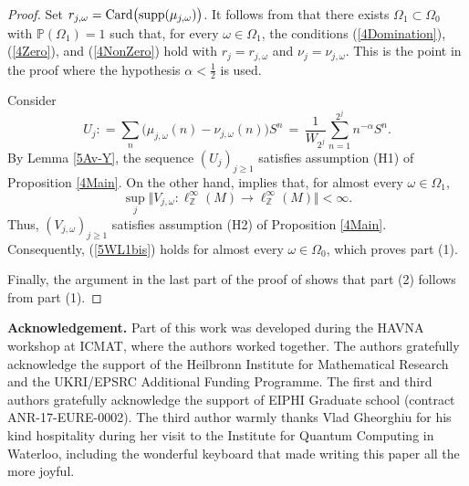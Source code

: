 \documentclass[12pt]{amsart}
\newcommand{\Pdb}{\mbox{$\mathbb{P}$}}
\newcommand{\bignorm}[1]{\bigl\Vert#1\bigr\Vert}
\theoremstyle{remark}
\theoremstyle{definition}
\numberwithin{equation}{section}
\begin{document}
\begin{proof}
Set $r_{j,\omega} = {\rm Card}\bigl({\rm supp}(\mu_{j,\omega})\bigr)$.
It follows from \cite[Section 4]{LaV} that there exists
$\Omega_1\subset\Omega_0$ with $\Pdb(\Omega_1)=1$ such that,
for every $\omega\in\Omega_1$, the conditions
(\ref{4Domination}), (\ref{4Zero}), and (\ref{4NonZero}) hold with
$r_j=r_{j,\omega}$ and $\nu_j=\nu_{j,\omega}$. This is the point in the proof where the hypothesis $\alpha<\frac12$ is used.

Consider 
$$
U_{j} : = \sum_n\bigl(\mu_{j,\omega}(n)-\nu_{j,\omega}(n)\bigr) S^n\,
=\,\frac{1}{W_{2^j}}\sum_{n=1}^{2^j} n^{-\alpha} S^n.
$$
By Lemma \ref{5Av-Y}, the sequence $(U_j)_{j\geq1}$ satisfies
assumption (H1) of Proposition \ref{4Main}. On the other hand,
\cite[Lemma 5.5]{LZ} implies that, for almost every
$\omega\in\Omega_1$,
$$
\sup_j
\bignorm{V_{j,\omega}\colon
\ell^\infty_{\mathbb Z}(M)\longrightarrow\ell^\infty_{\mathbb Z}(M)}
<\infty.
$$
Thus, $(V_{j,\omega})_{j\geq1}$ satisfies assumption (H2) of
Proposition \ref{4Main}. Consequently, (\ref{5WL1bis}) holds for
almost every $\omega\in\Omega_0$, which proves part (1).

Finally, the argument in the last part of the proof of \cite[Theorem 5.2]{LZ} shows that part (2) follows from part (1).
\end{proof}


\bigskip\noindent
{\bf Acknowledgement.} Part of this work was developed during the HAVNA workshop at ICMAT, where the authors worked together. The authors gratefully acknowledge the support of the Heilbronn Institute for Mathematical Research and the UKRI/EPSRC Additional Funding Programme. The first and third authors gratefully acknowledge the support of EIPHI Graduate school (contract ANR-17-EURE-0002). The third author warmly thanks Vlad Gheorghiu for his kind hospitality during her visit to the Institute for Quantum Computing in Waterloo, including the wonderful keyboard that made writing this paper all the more joyful.


\vskip 1cm
\end{document}
